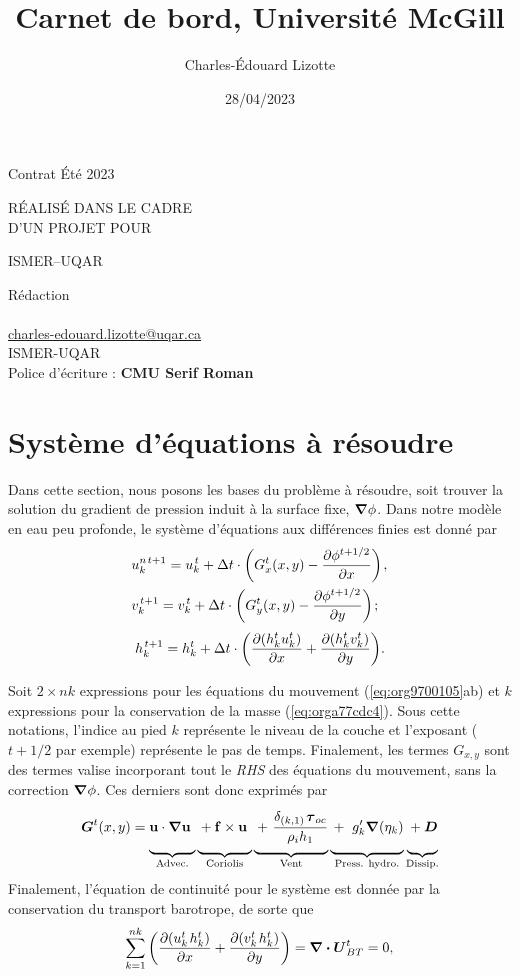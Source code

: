 \documentclass[10pt]{report}
\author{Charles-Édouard Lizotte}
\date{28/04/2023}
\title{Carnet de bord, Université McGill}
\makeatletter
\numberwithin{equation}{section}
\newcommand{\uu}{\vb{u}}
\newcommand{\venti}{\vphantom{\sum_x^x}}
\newcommand{\pt}{\hspace{1pt}} %
\newcommand{\mytitlepage}{
\begin{titlepage}
\begin{center}
{\Huge Contrat Été 2023 \par}
\vspace{2cm}
{\Huge \MakeUppercase{\thetitle} \par}
\vspace{2cm}
RÉALISÉ DANS LE CADRE\\ D'UN PROJET POUR \par
\vspace{2cm}
{\Huge ISMER--UQAR \par}
\vspace{2cm}
{\thedate}
\end{center}
\vfill
Rédaction \\
{\theauthor}\\
\url{charles-edouard.lizotte@uqar.ca}\\
ISMER-UQAR\\
Police d'écriture : \textbf{CMU Serif Roman}
\end{titlepage}
}
\makeatother
\begin{document}
\mytitlepage
\tableofcontents\newpage

\section{Système d'équations à résoudre}
\label{sec:org476c4fa}

Dans cette section, nous posons les bases du problème à résoudre, soit trouver la solution du gradient de pression induit à la surface fixe, \(\gradient \phi\).
Dans notre modèle en eau peu profonde, le système d'équations aux différences finies est donné par
\begin{subequations}
\label{eq:org9700105}
\begin{align}
&u^{n\pt t+1}_k = u^{\pt t}_k + \Delta t \cdot \qty(G^t_x(x,y) - \pdv{\phi^{t+1/2}}{x})\pt,\\
&v^{\pt t+1}_k = v^{\pt t}_k + \Delta t \cdot \qty(G^t_y(x,y) - \pdv{\phi^{t+1/2}}{y})\pt;
\end{align}
\end{subequations}
\begin{equation}
\label{eq:orga77cdc4}
h^{\pt t+1}_k = h^t_k + \Delta t \cdot \qty(\pdv{(h^t_k u^t_k)}{x} + \pdv{(h^t_k v^t_k)}{y}).
\end{equation}

Soit \(2 \times nk\) expressions pour les équations du mouvement (\ref{eq:org9700105}ab) et \(k\) expressions pour la conservation de la masse (\ref{eq:orga77cdc4}). 
Sous cette notations, l'indice au pied \(k\) représente le niveau de la couche et l'exposant (\(t+1/2\) par exemple) représente le pas de temps.
Finalement, les termes \(G_{x,y}\) sont des termes valise incorporant tout le \emph{RHS} des équations du mouvement, sans la correction \(\gradient \phi\).
Ces derniers sont donc exprimés par
\begin{equation}
\vb*{G}^t(x,y) =
\underbrace{ \venti\uu \cdot \gradient{\uu}\ }_\text{Advec.}
\underbrace{ \venti + \vb{f}\times \uu\ }_\text{Coriolis} 
\underbrace{ \venti+\pt \frac{\delta_{(k,1)}\pt \boldsymbol{\tau}_{oc}}{\rho_i h_1}}_\text{Vent}
\underbrace{ \venti+\ g'_{k} \gradient(\eta_k)}_\text{Press. hydro.}
\underbrace{ \venti+ \vb*{D}}_\text{Dissip.}
\end{equation}
Finalement, l'équation de continuité pour le système est donnée par la conservation du transport barotrope, de sorte que
\begin{equation}
\label{eq:orgcb61e1f}
\sum_{k=1}^{nk}  \qty(\pdv{(u^t_k\pt h^t_k)}{x} + \pdv{(v^t_k\pt h^t_k)}{y}) = \div{\vb*{U}^t_{BT}} = 0,
\end{equation}
\end{document}
